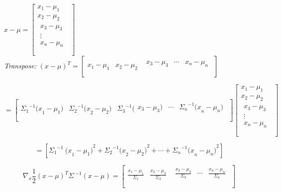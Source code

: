 \documentclass[
]{article}
\begin{document}
\(x - \mu = \left\lbrack \begin{matrix}
x_{1} - \mu_{1} \\
x_{2} - \mu_{2} \\
\begin{matrix}
x_{3} - \mu_{3} \\
 \vdots \\
x_{n} - \mu_{n} \\
\end{matrix} \\
\end{matrix}\  \right\rbrack\)\\\emph{Transpose:}
\({(x - \mu)}^{T} = \begin{bmatrix}
x_{1} - \mu_{1} & x_{2} - \mu_{2} & \begin{matrix}
x_{3} - \mu_{3} & \cdots & x_{n} - \mu_{n} \\
\end{matrix} \\
\end{bmatrix}\)



\[= \begin{bmatrix}
{{\Sigma_{1}}^{- 1}(x}_{1} - \mu_{1}) & {{\Sigma_{2}}^{- 1}(x}_{2} - \mu_{2}) & {\Sigma_{3}}^{- 1}(\begin{matrix}
x_{3} - \mu_{3}) & \cdots & {{\Sigma_{n}}^{- 1}(x}_{n} - \mu_{n}) \\
\end{matrix} \\
\end{bmatrix}\left\lbrack \begin{matrix}
x_{1} - \mu_{1} \\
x_{2} - \mu_{2} \\
\begin{matrix}
x_{3} - \mu_{3} \\
 \vdots \\
x_{n} - \mu_{n} \\
\end{matrix} \\
\end{matrix}\  \right\rbrack\]

\[= \left\lbrack {{{\Sigma_{1}}^{- 1}\ (x}_{1} - \mu_{1})}^{2} + {{{\Sigma_{2}}^{- 1}(x}_{2} - \mu_{2})}^{2} + \cdots + {{{\Sigma_{n}}^{- 1}(x}_{n} - \mu_{n})}^{2} \right\rbrack\]

\[\nabla_{x}\frac{1}{2}\left( x - \mu \right)^{T}{\Sigma\ }^{- 1}\left( x - \mu \right) = \begin{bmatrix}
\frac{x_{1} - \mu_{1}}{\Sigma_{1}} & \frac{x_{2} - \mu_{2}}{\Sigma_{2}} & \begin{matrix}
\frac{x_{3} - \mu_{3}}{\Sigma_{3}} & \cdots & \frac{x_{n} - \mu_{n}}{\Sigma_{n}} \\
\end{matrix} \\
\end{bmatrix}\]
\end{document}
